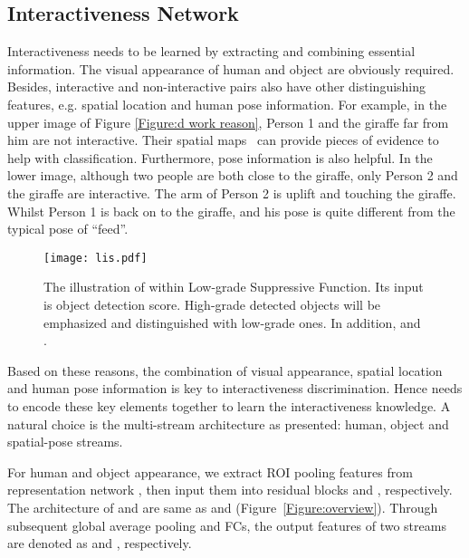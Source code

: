 \documentclass[10pt,twocolumn,letterpaper]{article}
\begin{document}
\subsection{Interactiveness Network}
\label{sec:d}
Interactiveness needs to be learned by extracting and combining essential information. The visual appearance of human and object are obviously required.
Besides, interactive and non-interactive pairs also have other distinguishing features, e.g. spatial location and human pose information.
For example, in the upper image of Figure \ref{Figure:d work reason}, Person 1 and the giraffe far from him are not interactive. Their spatial maps~\cite{hicodet} can provide pieces of evidence to help with classification. 
Furthermore, pose information is also helpful. In the lower image, although two people are both close to the giraffe, only Person 2 and the giraffe are interactive. The arm of Person 2 is uplift and touching the giraffe. Whilst Person 1 is back on to the giraffe, and his pose is quite different from the typical pose of ``feed''.

\begin{figure}[!ht]
	\begin{center}
		\texttt{[image: lis.pdf]}
	\end{center}
	\caption{The illustration of  within Low-grade Suppressive Function. Its input is object detection score. High-grade detected objects will be emphasized and distinguished with low-grade ones. In addition,  and . }
	\label{Figure:logictic}
	\vspace{-0.3cm}
\end{figure}
Based on these reasons, the combination of visual appearance, spatial location and human pose information is key to interactiveness discrimination. Hence  needs to encode these key elements together to learn the interactiveness knowledge. A natural choice is the multi-stream architecture as presented: human, object and spatial-pose streams.

 For human and object appearance, we extract ROI pooling features from representation network , then input them into residual blocks  and , respectively. The architecture of  and  are same as  and  (Figure~\ref{Figure:overview}). Through subsequent global average pooling and FCs, the output features of two streams are denoted as  and , respectively. 
\end{document}

